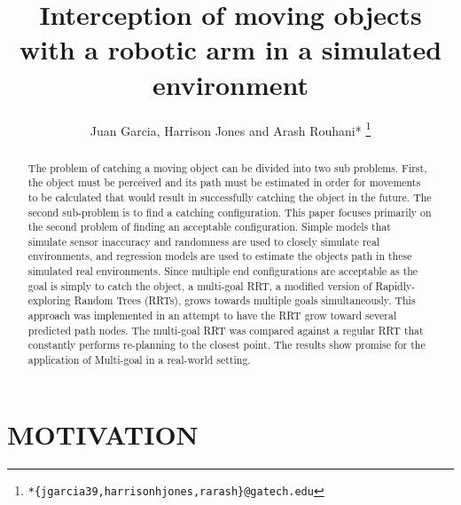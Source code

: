 \documentclass[letterpaper, 10 pt, conference]{ieeeconf}  %
\title{\LARGE \bf
Interception of moving objects with a robotic arm in a simulated environment
}
\author{Juan Garcia, Harrison Jones and Arash Rouhani*
  \thanks{\texttt{*\{jgarcia39,harrisonhjones,rarash\}@gatech.edu}}
}
\begin{document}
\maketitle
\thispagestyle{empty}
\pagestyle{empty}


\begin{abstract}

The problem of catching a moving object can be divided into two sub problems.
First, the object must be perceived and its path must be estimated in order for
movements to be calculated that would result in successfully catching the
object in the future. The second sub-problem is to find a catching
configuration. This paper focuses primarily on the second problem of finding an
acceptable configuration. Simple models that simulate sensor inaccuracy and
randomness are used to closely simulate real environments, and regression
models are used to estimate the objects path in these simulated real
environments. Since multiple end configurations are acceptable as the goal is
simply to catch the object, a multi-goal RRT, a modified version of
Rapidly-exploring Random Trees (RRTs), grows towards multiple goals
simultaneously. This approach was implemented in an attempt to have the RRT
grow toward several predicted path nodes. The multi-goal RRT was compared
against a regular RRT that constantly performs re-planning to the closest
point. The results show promise for the application of Multi-goal in a
real-world setting.

\end{abstract}

\section{MOTIVATION}
\end{document}
